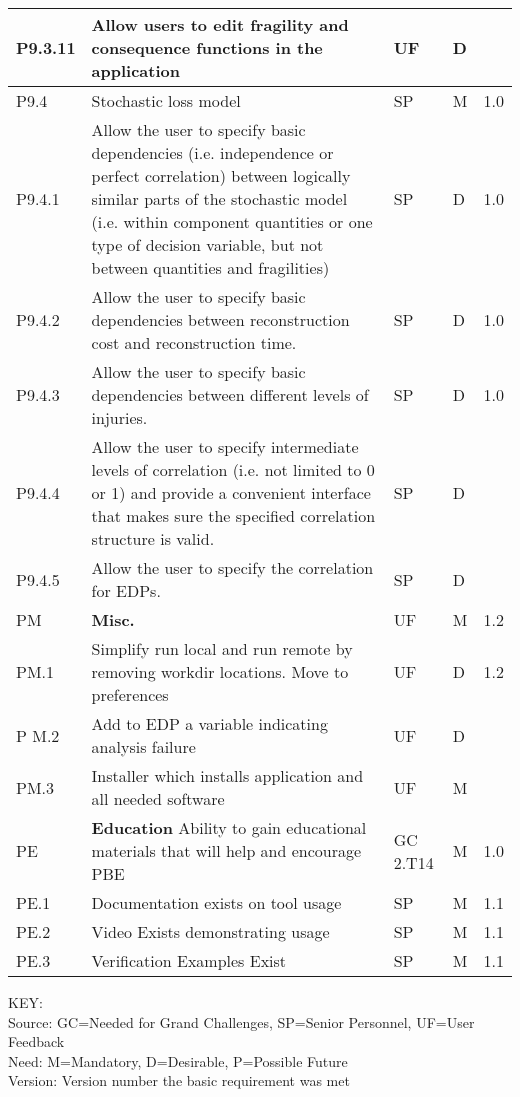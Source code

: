 \begin{longtable}{| p{} | p{} | p{} | p{} |  p{} |}
P9.3.11 & Allow users to edit fragility and consequence functions in the application & UF & D &  \\ \hline
P9.4 & Stochastic loss model & SP & M & 1.0 \\ \hline
P9.4.1 & Allow the user to specify basic dependencies (i.e. independence or perfect correlation) between logically similar parts of the stochastic model (i.e. within component quantities or one type of decision variable, but not between quantities and fragilities) & SP & D & 1.0 \\ \hline
P9.4.2 & Allow the user to specify basic dependencies between reconstruction cost and reconstruction time. & SP & D & 1.0 \\ \hline
P9.4.3 & Allow the user to specify basic dependencies between different levels of injuries. & SP & D & 1.0 \\ \hline
P9.4.4 & Allow the user to specify intermediate levels of correlation (i.e. not limited to 0 or 1) and provide a convenient interface that makes sure the specified correlation structure is valid. & SP & D & \\ \hline   
P9.4.5 & Allow the user to specify the correlation for EDPs. & SP & D &  \\ \hhline{=====}

 PM & \textbf{Misc.} & UF & M & 1.2  \\ \hline
   PM.1 & Simplify run local and run remote by removing workdir locations. Move to preferences & UF & D & 1.2  \\ \hline
  P M.2 & Add to EDP a variable indicating analysis failure & UF & D &   \\ \hline
   PM.3 & Installer which installs application and all needed software & UF & M &   \\ \hhline{=====}
 PE & \textbf{Education} Ability to gain educational materials that will help and encourage PBE &  GC 2.T14  & M & 1.0 \\ \hline
 PE.1 & Documentation exists on tool usage & SP & M & 1.1  \\ \hline
 PE.2 & Video Exists demonstrating usage & SP & M & 1.1  \\ \hline
 PE.3 & Verification Examples Exist & SP & M & 1.1  \\ \hline
  \bottomrule               
\end{longtable}


\noindent
KEY:\\
Source: GC=Needed for Grand Challenges, SP=Senior Personnel, UF=User Feedback \\
Need: M=Mandatory, D=Desirable, P=Possible Future \\
Version: Version number the basic requirement was met 

